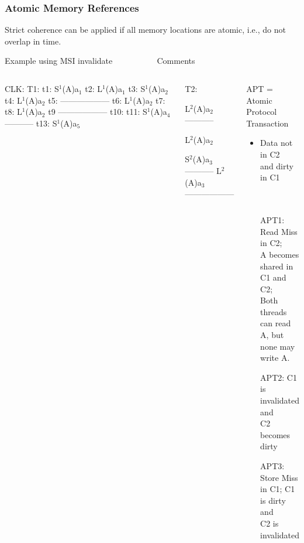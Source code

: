 \documentclass{beamer}
\newcommand{\emp}[1]{\textcolor{DikuRed}{ #1}}
\newcommand{\mymath}[1]{$ #1 $}
\newcommand{\myindx}[1]{_{#1}}
\newcommand{\myindu}[1]{^{#1}}
\begin{document}
\begin{frame}[fragile,t]
\frametitle{Atomic Memory References}

Strict coherence can be applied if all memory locations are atomic,
i.e., do not overlap in time.

\begin{block}{Example using MSI invalidate{\tt~~~~~~~~~~} Comments}
\begin{columns}
\begin{colorcode}[fontsize=\scriptsize]
CLK: T1:
t1:  S\mymath{\myindu{1}}(A)a\mymath{\myindx{1}}
t2:  L\mymath{\myindu{1}}(A)a\mymath{\myindx{1}}
t3:  S\mymath{\myindu{1}}(A)a\mymath{\myindx{2}}
t4:  L\mymath{\myindu{1}}(A)a\mymath{\myindx{2}}
t5:  ------------------
t6:  L\mymath{\myindu{1}}(A)a\mymath{\myindx{2}}
t7:  
t8:  L\mymath{\myindu{1}}(A)a\mymath{\myindx{2}}
t9   ------------------
t10: 
t11: S\mymath{\myindu{1}}(A)a\mymath{\myindx{4}}-----------
t13: S\mymath{\myindu{1}}(A)a\mymath{\myindx{5}}
\end{colorcode} 
\begin{colorcode}[fontsize=\scriptsize]
T2:




L\mymath{\myindu{2}}(A)a\mymath{\myindx{2}}-----------

L\mymath{\myindu{2}}(A)a\mymath{\myindx{2}}

S\mymath{\myindu{2}}(A)a\mymath{\myindx{3}}-----------
L\mymath{\myindu{2}}(A)a\mymath{\myindx{3}}
------------------

\end{colorcode} 
\begin{scriptsize}
\emp{APT} = Atomic Protocol Transaction\\
\begin{itemize}
    \item Data not in C2\\
            and dirty in C1\\
            {\tt~~}\\
            {\tt~~}\\

    \item[\emp{APT1}:] Read Miss in C2;\\
                        A becomes shared in C1 and C2;\\
                        Both threads can read A, but\\
                        none may write A.
    \item[\emp{APT2}:] C1 is invalidated and\\ 
                      C2 becomes dirty
    \item[\emp{APT3:}] Store Miss in C1; C1 is dirty and\\
                        C2 is invalidated
\end{itemize}
\end{scriptsize}
\end{columns}
\end{block}

\end{frame}
\end{document}
